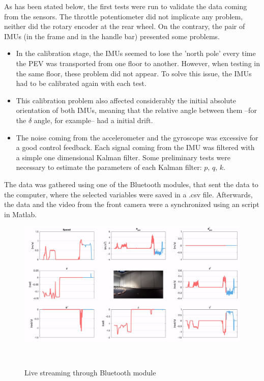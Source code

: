 As has been stated below, the first tests were run to validate the data coming from the sensors. The throttle potentiometer did not implicate any problem, neither did the rotary encoder at the rear wheel. On the contrary, the pair of IMUs (in the frame and in the handle bar) presented some problems.
\begin{itemize}
\begin{itemize}
\item In the calibration stage, the IMUs seemed to lose the 'north pole' every time the PEV was transported from one floor to another. However, when testing in the same floor, these problem did not appear. To solve this issue, the IMUs had to be calibrated again with each test. 

\item This calibration problem also affected considerably the initial absolute orientation of both IMUs, meaning that the relative angle between them --for the $\delta$ angle, for example-- had a initial drift.

\item The noise coming from the accelerometer and the gyroscope was excessive for a good control feedback. Each signal coming from the IMU was filtered with a simple one dimensional Kalman filter. Some preliminary tests were necessary to estimate the parameters of each Kalman filter: $p,\, q,\,k$.

\end{itemize}
\end{itemize}

The data was gathered using one of the Bluetooth modules, that sent the data to the computer, where the selected variables were saved in a .csv file. Afterwards, the data and the video from the front camera were a synchronized using an script in Matlab.

\begin{figure}[!h]
	\includegraphics[width=1\linewidth]{figs/06/live}
	\caption{Live streaming through Bluetooth module}
	\\[-1cm]
\end{figure}

